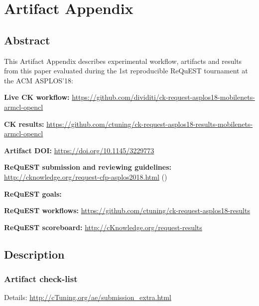 \onecolumn

\section{Artifact Appendix}
\label{artifact_appendix}

\subsection{Abstract}

This Artifact Appendix describes experimental workflow,
artifacts and results from this paper evaluated 
during the 1st reproducible ReQuEST tournament at the ACM ASPLOS'18:

\begin{packed_itemize}
  \item {\bf Live CK workflow:} \url{https://github.com/dividiti/ck-request-asplos18-mobilenets-armcl-opencl}
  \item {\bf CK results:} \url{https://github.com/ctuning/ck-request-asplos18-results-mobilenets-armcl-opencl}
  \item {\bf Artifact DOI:} \url{https://doi.org/10.1145/3229773}
  \item {\bf ReQuEST submission and reviewing guidelines:} \url{http://cknowledge.org/request-cfp-asplos2018.html} (\cite{request-asplos18})
  \item {\bf ReQuEST goals:} \cite{cm:29db2248aba45e59:0c7348dfbadd5b95}
  \item {\bf ReQuEST workflows:} \url{https://github.com/ctuning/ck-request-asplos18-results}
  \item {\bf ReQuEST scoreboard:} \url{http://cKnowledge.org/request-results}
\end{packed_itemize}

\subsection{Description}

\subsubsection{Artifact check-list}

Details: \url{http://cTuning.org/ae/submission_extra.html}


